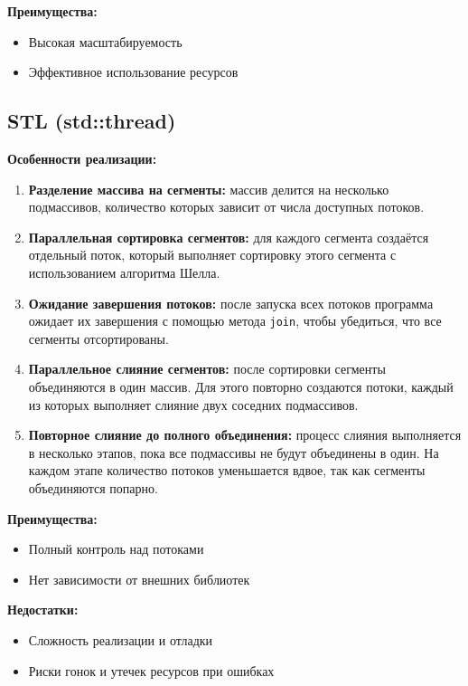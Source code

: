 \documentclass[a4paper,12pt]{article}
\begin{document}
\textbf{Преимущества:}
\begin{itemize}
  \item Высокая масштабируемость
  \item Эффективное использование ресурсов
\end{itemize}

\newpage

\subsection*{STL (std::thread)}

\textbf{Особенности реализации:}
\begin{enumerate}
  \item \textbf{Разделение массива на сегменты:} массив делится на несколько подмассивов, количество которых зависит от числа доступных потоков.
  
  \item \textbf{Параллельная сортировка сегментов:} для каждого сегмента создаётся отдельный поток, который выполняет сортировку этого сегмента с использованием алгоритма Шелла.
  
  \item \textbf{Ожидание завершения потоков:} после запуска всех потоков программа ожидает их завершения с помощью метода \texttt{join}, чтобы убедиться, что все сегменты отсортированы.
  
  \item \textbf{Параллельное слияние сегментов:} после сортировки сегменты объединяются в один массив. Для этого повторно создаются потоки, каждый из которых выполняет слияние двух соседних подмассивов.
  
  \item \textbf{Повторное слияние до полного объединения:} процесс слияния выполняется в несколько этапов, пока все подмассивы не будут объединены в один. На каждом этапе количество потоков уменьшается вдвое, так как сегменты объединяются попарно.
\end{enumerate}


\textbf{Преимущества:}
\begin{itemize}
  \item Полный контроль над потоками
  \item Нет зависимости от внешних библиотек
\end{itemize}

\textbf{Недостатки:}
\begin{itemize}
  \item Сложность реализации и отладки
  \item Риски гонок и утечек ресурсов при ошибках
\end{itemize}
\end{document}
